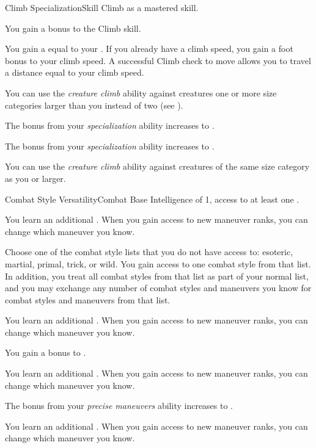     \begin{feat}{Climb Specialization}{Skill}
        \featpre Climb as a mastered skill.

         You gain a  bonus to the Climb skill.

         You gain a  equal to your .
        If you already have a climb speed, you gain a  foot bonus to your climb speed.
        A successful Climb check to move allows you to travel a distance equal to your climb speed.

         You can use the \textit{creature climb} ability against creatures one or more size categories larger than you instead of two (see ).

         The bonus from your \textit{specialization} ability increases to .


         The bonus from your \textit{specialization} ability increases to .

         You can use the \textit{creature climb} ability against creatures of the same size category as you or larger.
    \end{feat}

    \begin{feat}{Combat Style Versatility}{Combat}
        \featpre Base Intelligence of 1, access to at least one .

         You learn an additional .
        When you gain access to new maneuver ranks, you can change which maneuver you know.

         Choose one of the combat style lists that you do not have access to: esoteric, martial, primal, trick, or wild.
        You gain access to one combat style from that list.
        In addition, you treat all combat styles from that list as part of your normal list, and you may exchange any number of combat styles and maneuvers you know for combat styles and maneuvers from that list.

         You learn an additional .
        When you gain access to new maneuver ranks, you can change which maneuver you know.

         You gain a  bonus to .

         You learn an additional .
        When you gain access to new maneuver ranks, you can change which maneuver you know.

         The bonus from your \textit{precise maneuvers} ability increases to .

         You learn an additional .
        When you gain access to new maneuver ranks, you can change which maneuver you know.
    \end{feat}


